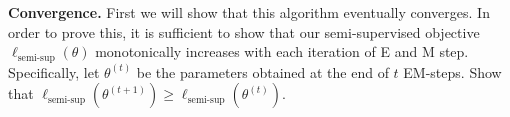 \item{}

\textbf{Convergence.}
First we will show that this algorithm eventually converges. In order to prove this, it is sufficient to show that our semi-supervised objective $\ell_\text{semi-sup}(\theta)$ monotonically increases with each iteration of E and M step. Specifically, let $\theta^{(t)}$ be the parameters obtained at the end of $t$ EM-steps. Show that $\ell_\text{semi-sup}(\theta^{(t+1)}) \ge \ell_\text{semi-sup}(\theta^{(t)})$.
